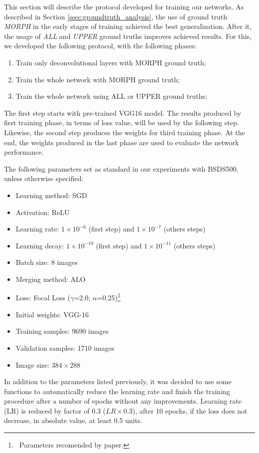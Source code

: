 This section will describe the protocol developed for training our networks. 
As described in Section \ref{ssec:groundtruth_analysis}, the use of ground truth \textit{MORPH} in the early stages of training achieved the best generalization.
After it, the usage of \textit{ALL} and \textit{UPPER} ground truths improves achieved results.
For this, we developed the following protocol, with the following phases:

\begin{enumerate}
    \item Train only deconvolutional layers with MORPH ground truth;
    \item Train the whole network with MORPH ground truth;
    \item Train the whole network using ALL or UPPER ground truths;
\end{enumerate}

The first step starts with pre-trained VGG16 model.
The results produced by first training phase, in terms of loss value, will be used by the following step.
Likewise, the second step produces the weights for third training phase.
At the end, the weights produced in the last phase are used to evaluate the network performance.

The following parameters set as standard in our experiments with BSDS500, unless otherwise specified:
\begin{itemize}
    \item Learning method: SGD
    \item Activation: ReLU
    \item Learning rate: $1 \times 10^{-6}$ (first step) and $1 \times 10^{-7}$ (others steps)
    \item Learning decay: $1 \times 10^{-10}$ (first step) and $1 \times 10^{-11}$ (others steps)
    \item Batch size: 8 images
    \item Merging method: ALO
    \item Loss: Focal Loss ($\gamma$=2.0; $\alpha$=0.25)\footnote{~Parameters recomended by  paper.}
    \item Initial weights: VGG-16
    \item Training samples: 9690 images 
    \item Validation samples: 1710 images
    \item Image size: $384 \times 288$
\end{itemize}

In addition to the parameters listed previously, it was decided to use some functions to automatically reduce the learning rate and finish the training procedure after a number of epochs without any improvements. 
Learning rate (LR) is reduced by factor of 0.3 ($LR \times 0.3$), after 10 epochs, if the loss does not decrease, in absolute value, at least 0.5 units.


